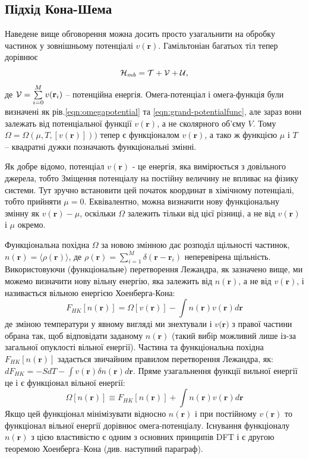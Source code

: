 \subsection{Підхід Кона-Шема}
Наведене вище обговорення можна досить просто узагальнити на обробку частинок у зовнішньому потенціалі $v(\textbf{r})$. Гамільтоніан багатьох тіл тепер дорівнює
\begin{equation}
\label{eqn:Ham}
	{\cal H}_{mb} = {\cal T} +{\cal V} +{\cal U},
\end{equation}
де ${\cal V} = \sum\limits_{i=0}^M v(\textbf{r}_i)$ -- потенційна енергія. Омега-потенціал і омега-функція були визначені як рів.\ref{eqn:omegapotential} та \ref{eqn:grand-potentialfunc}, але зараз вони залежать від потенціальної функції $v(\textbf{r})$, а не сколярного об'єму $V$. Тому $\Omega = \Omega(\mu, T, [v(\textbf{r})]))$ тепер є функціоналом $v(\textbf{r})$, а тако ж функцією $\mu$ і $T$ -- квадратні дужки позначають функціональні змінні. 

Як добре відомо, потенціал $v(\textbf{r})$ - це енергія, яка вимірюється з довільного джерела, тобто Зміщення потенціалу на постійну величину не впливає на фізику системи. Тут зручно встановити цей початок координат в хімічному потенціалі, тобто прийняти $\mu = 0$. Еквівалентно, можна визначити нову функціональну змінну як $v(\textbf{r}) - \mu$, оскільки $\Omega$ залежить тільки від цієї різниці, а не від $v(\textbf{r})$ і $\mu$ окремо.

Функціональна похідна $\Omega$ за новою змінною дає розподіл щільності частинок, $n(\textbf{r}) = \langle \rho (\textbf{r}) \rangle$, де $\rho(\textbf{r}) = \sum\limits_{i=1}^M\delta(\textbf{r}-\textbf{r}_i)$ неперевірена щільність. Використовуючи (функціональне) перетворення Лежандра, як зазначено вище, ми можемо визначити нову вільну енергію, яка залежить від $n(\textbf{r})$, а не від $v(\textbf{r})$, і називається вільною енергією Хоенберга-Кона:
\begin{equation}
	\label{eqn:free_energ_hoenberg-khon}
	F_{HK}[n(\textbf{r})] = \Omega[v(\textbf{r})] - \int{n(\textbf{r}) v(\textbf{r})d\textbf{r}} 
\end{equation}
де зміною температури у явному вигляді ми знехтували і $v(\textbf{r)}$ з правої частини обрана так, щоб відповідати заданому $n(\textbf{r})$ (такий вибір можливий лише із-за загальної опуклості вільної енергії). Частина та функціональна похідна $F_{HK}[n(\textbf{r})]$ задається звичайним правилом перетворення Лежандра, як: $dF_{HK} = -SdT - \int{v(\textbf{r})\delta n(\textbf{r})d\textbf{r}}$.
Пряме узагальнення функції вильної енергії це і є функціонал вільної енергії:
\begin{equation}
	\label{eqn:free_energ_functional}
	\Omega[n(\textbf{r})] \equiv F_{HK}[n(\textbf{r})] + \int{n(\textbf{r})v(\textbf{r})d\textbf{r}}
\end{equation}
Якщо цей функціонал мінімізувати відносно $n(\textbf{r})$ і при постійному $v(\textbf{r})$ то функціонал вільної енергії дорівнює омега-потенціалу. Існування функціоналу $n(\textbf{r})$ з цією властивістю є одним з основних принципів DFT і є другою теоремою Хоенберга–Кона (див. наступний параграф).


